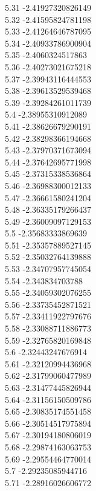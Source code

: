 {5.31	-2.41927320826149\\
5.32	-2.41595824781198\\
5.33	-2.41264646787095\\
5.34	-2.40933786900904\\
5.35	-2.4060324517863\\
5.36	-2.40273021675218\\
5.37	-2.39943116444553\\
5.38	-2.39613529539468\\
5.39	-2.39284261011739\\
5.4	-2.38955310912089\\
5.41	-2.38626679290191\\
5.42	-2.38298366194668\\
5.43	-2.37970371673094\\
5.44	-2.37642695771998\\
5.45	-2.37315338536864\\
5.46	-2.36988300012133\\
5.47	-2.36661580241204\\
5.48	-2.36335179266437\\
5.49	-2.36009097129153\\
5.5	-2.35683333869639\\
5.51	-2.35357889527145\\
5.52	-2.35032764139888\\
5.53	-2.34707957745054\\
5.54	-2.343834703788\\
5.55	-2.34059302076255\\
5.56	-2.33735452871521\\
5.57	-2.33411922797676\\
5.58	-2.33088711886773\\
5.59	-2.32765820169848\\
5.6	-2.32443247676914\\
5.61	-2.32120994436968\\
5.62	-2.31799060477989\\
5.63	-2.31477445826944\\
5.64	-2.31156150509786\\
5.65	-2.30835174551458\\
5.66	-2.30514517975894\\
5.67	-2.30194180806019\\
5.68	-2.29874163063753\\
5.69	-2.29554464770014\\
5.7	-2.29235085944716\\
5.71	-2.28916026606772\\
}
